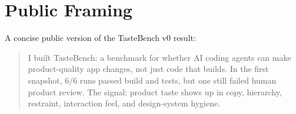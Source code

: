 \documentclass[11pt]{article}
\begin{document}
\section{Public Framing}

A concise public version of the TasteBench v0 result:

\begin{quote}
I built TasteBench: a benchmark for whether AI coding agents can make product-quality app changes, not just code that builds. In the first snapshot, 6/6 runs passed build and tests, but one still failed human product review. The signal: product taste shows up in copy, hierarchy, restraint, interaction feel, and design-system hygiene.
\end{quote}
\end{document}
